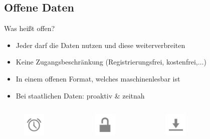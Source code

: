 \subsection{Offene Daten}
\begin{frame}{Was heißt offen?}
 \begin{itemize}
  \item Jeder darf die Daten nutzen und diese weiterverbreiten
  \item Keine Zugangsbeschränkung (Registrierungsfrei, kostenfrei,$\dots$)
  \item In einem offenen Format, welches maschinenlesbar ist
  \item Bei staatlichen Daten: proaktiv \& zeitnah
 \end{itemize}
 
 \begin{block}{}
  \begin{columns}
   \begin{figure}\centering
    \includegraphics[scale=0.3]{section_open_data_open_proactive.png}
   \end{figure}
   \begin{figure}\centering
    \includegraphics[scale=0.3]{section_open_data_open_restriction_free.png}
   \end{figure}
   \begin{figure}\centering
    \includegraphics[scale=0.3]{section_open_data_open_restriction_free2.png}
   \end{figure}
   \begin{figure}\centering

\end{figure}
\end{columns}
\end{block}
\end{frame}
